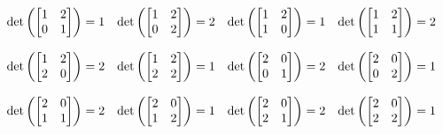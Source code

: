 \begin{mdframed}[style=darkAnswer,frametitle={Joe Starr}]
$$\begin{matrix}
\text{det}\lrp{\begin{bmatrix} 1 & 2 \\ 0 & 1 \end{bmatrix}}= 1 &
\text{det}\lrp{\begin{bmatrix} 1 & 2 \\ 0 & 2 \end{bmatrix}}= 2 &
\text{det}\lrp{\begin{bmatrix} 1 & 2 \\ 1 & 0 \end{bmatrix}}= 1 &
\text{det}\lrp{\begin{bmatrix} 1 & 2 \\ 1 & 1 \end{bmatrix}}= 2 \\ \hspace{.5in} \\
\text{det}\lrp{\begin{bmatrix} 1 & 2 \\ 2 & 0 \end{bmatrix}}= 2 &
\text{det}\lrp{\begin{bmatrix} 1 & 2 \\ 2 & 2 \end{bmatrix}}= 1 &
\text{det}\lrp{\begin{bmatrix} 2 & 0 \\ 0 & 1 \end{bmatrix}}= 2 &
\text{det}\lrp{\begin{bmatrix} 2 & 0 \\ 0 & 2 \end{bmatrix}}= 1 \\ \hspace{.5in} \\
\text{det}\lrp{\begin{bmatrix} 2 & 0 \\ 1 & 1 \end{bmatrix}}= 2 &
\text{det}\lrp{\begin{bmatrix} 2 & 0 \\ 1 & 2 \end{bmatrix}}= 1 &
\text{det}\lrp{\begin{bmatrix} 2 & 0 \\ 2 & 1 \end{bmatrix}}= 2 &
\text{det}\lrp{\begin{bmatrix} 2 & 0 \\ 2 & 2 \end{bmatrix}}= 1 \\ \hspace{.5in} \\

\end{matrix}$$
\end{mdframed}
